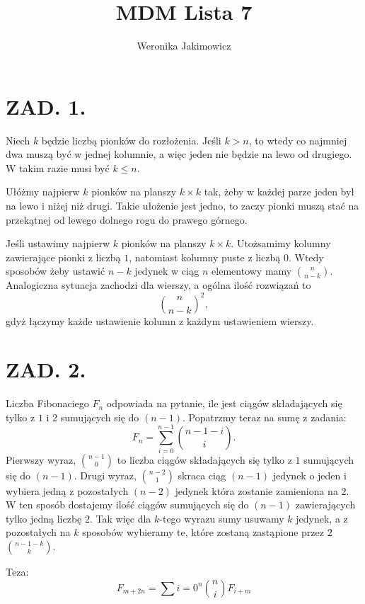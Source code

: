 \documentclass{article}[13pt]
\author{Weronika Jakimowicz}
\title{MDM Lista 7}
\date{}
\begin{document}
\maketitle

\section*{ZAD. 1.}

Niech $k$ będzie liczbą pionków do rozłożenia. Jeśli $k>n$, to wtedy co najmniej dwa muszą być w jednej kolumnie, a więc jeden nie będzie na lewo od drugiego. W takim razie musi być $k\leq n$.
\medskip

Ułóżmy najpierw $k$ pionków na planszy $k\times k$ tak, żeby w każdej parze jeden był na lewo i niżej niż drugi. Takie ułożenie jest jedno, to zaczy pionki muszą stać na przekątnej od lewego dolnego rogu do prawego górnego.

Jeśli ustawimy najpierw $k$ pionków na planszy $k\times k$. Utożsamimy kolumny zawierające pionki z liczbą $1$, natomiast kolumny puste z liczbą $0$. Wtedy sposobów żeby ustawić $n-k$ jedynek w ciąg $n$ elementowy mamy ${n\choose n-k}$. Analogiczna sytuacja zachodzi dla wierszy, a ogólna ilość rozwiązań to 
$${n\choose n-k}^2,$$ 
gdyż łączymy każde ustawienie kolumn z każdym ustawieniem wierszy.

\section*{ZAD. 2.}

Liczba Fibonaciego $F_n$ odpowiada na pytanie, ile jest ciągów składających się tylko z $1$ i $2$ sumujących się do $(n-1)$. Popatrzmy teraz na sumę z zadania:
$$F_n=\sum\limits_{i=0}^{n-1}{n-1-i\choose i}.$$
Pierwszy wyraz, ${n-1\choose 0}$ to liczba ciągów składających się tylko z $1$ sumujących się do $(n-1)$. Drugi wyraz, ${n-2\choose 1}$ skraca ciąg $(n-1)$ jedynek o jeden i wybiera jedną z pozostałych $(n-2)$ jedynek która zostanie zamieniona na $2$. W ten sposób dostajemy ilość ciągów sumujących się do $(n-1)$ zawierających tylko jedną liczbę $2$. Tak więc dla $k$-tego wyrazu sumy usuwamy $k$ jedynek, a z pozostałych na $k$ sposobów wybieramy te, które zostaną zastąpione przez $2$ ${n-1-k\choose k}$.
\bigskip

\bigskip

Teza:
$$F_{m+2n}=\sum\limits{i=0}^n{n\choose i}F_{i+m}$$
\end{document}
